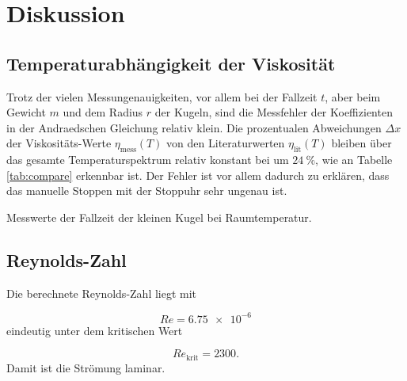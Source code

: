 \section{Diskussion}
\label{sec:Diskussion}

\subsection{Temperaturabhängigkeit der Viskosität}

Trotz der vielen Messungenauigkeiten, vor allem bei der Fallzeit $t$, aber
beim Gewicht $m$ und dem Radius $r$ der Kugeln, sind die Messfehler der
Koeffizienten in der Andraedschen Gleichung relativ klein.
Die prozentualen Abweichungen $\Delta x$ der Viskositäts-Werte
$\eta_\text{mess}(T)$ von den
Literaturwerten $\eta_\text{lit}(T)$ \cite{TfCuP}
bleiben über das gesamte Temperaturspektrum relativ konstant bei um $\SI{24}{\percent}$,
wie an Tabelle \ref{tab:compare} erkennbar ist.
Der Fehler ist vor allem dadurch zu erklären, dass das manuelle Stoppen mit der Stoppuhr sehr ungenau ist.


\begin{table}
  \centering
  
  \caption{Messwerte der Fallzeit der kleinen Kugel bei Raumtemperatur.}
  \label{tab:compare}
\end{table}


\subsection{Reynolds-Zahl}

Die berechnete Reynolds-Zahl liegt mit

\begin{equation}
  Re = \num{6.75e-6}
\end{equation}
eindeutig unter dem kritischen Wert

\begin{equation}
  Re_\text{krit} = 2300.
\end{equation}
Damit ist die Strömung laminar.